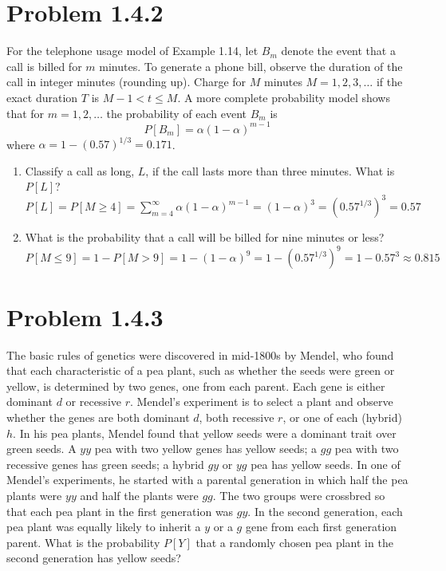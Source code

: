\documentclass{article}
\begin{document}
\newpage

\section*{Problem 1.4.2}
For the telephone usage model of Example 1.14, let $B_m$ denote the event that a call is billed for $m$ minutes. To generate a phone bill, observe the duration of the call in integer minutes (rounding up). Charge for $M$ minutes $M = 1, 2, 3, \dots$ if the exact duration $T$ is $M - 1 < t \le M$. A more complete probability model shows that for $m = 1, 2, \dots$ the probability of each event $B_m$ is
\[ P[B_m] = \alpha(1 - \alpha)^{m-1} \]
where $\alpha = 1 - (0.57)^{1/3} = 0.171$.

\begin{enumerate}[label=(\alph*)]
    \item Classify a call as long, $L$, if the call lasts more than three minutes. What is $P[L]$? \\
    {\boldmath\textbf{$P[L] = P[M \ge 4] = \sum_{m=4}^\infty \alpha(1-\alpha)^{m-1} = (1-\alpha)^3 = (0.57^{1/3})^3 = 0.57$}}
    
    \item What is the probability that a call will be billed for nine minutes or less? \\
    {\boldmath\textbf{$P[M \le 9] = 1 - P[M > 9] = 1 - (1-\alpha)^9 = 1 - (0.57^{1/3})^9 = 1 - 0.57^3 \approx 0.815$}}
\end{enumerate}

\newpage

\section*{Problem 1.4.3}
The basic rules of genetics were discovered in mid-1800s by Mendel, who found that each characteristic of a pea plant, such as whether the seeds were green or yellow, is determined by two genes, one from each parent. Each gene is either dominant $d$ or recessive $r$. Mendel's experiment is to select a plant and observe whether the genes are both dominant $d$, both recessive $r$, or one of each (hybrid) $h$. In his pea plants, Mendel found that yellow seeds were a dominant trait over green seeds. A $yy$ pea with two yellow genes has yellow seeds; a $gg$ pea with two recessive genes has green seeds; a hybrid $gy$ or $yg$ pea has yellow seeds. In one of Mendel's experiments, he started with a parental generation in which half the pea plants were $yy$ and half the plants were $gg$. The two groups were crossbred so that each pea plant in the first generation was $gy$. In the second generation, each pea plant was equally likely to inherit a $y$ or a $g$ gene from each first generation parent. What is the probability $P[Y]$ that a randomly chosen pea plant in the second generation has yellow seeds?
\end{document}
